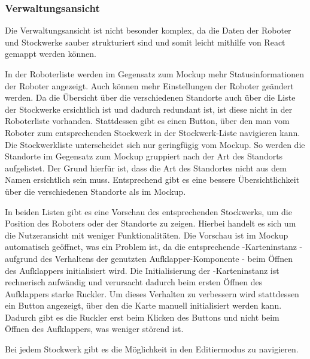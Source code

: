 \subsubsection{Verwaltungsansicht}
Die Verwaltungsansicht ist nicht besonder komplex, da die Daten der Roboter und Stockwerke sauber strukturiert sind und somit leicht mithilfe von React gemappt werden können.

In der Roboterliste werden im Gegensatz zum Mockup mehr Statusinformationen der Roboter angezeigt. Auch können mehr Einstellungen der Roboter geändert werden. Da die Übersicht über die verschiedenen Standorte auch über die Liste der Stockwerke ersichtlich ist und dadurch redundant ist, ist diese nicht in der Roboterliste vorhanden. Stattdessen gibt es einen Button, über den man vom Roboter zum entsprechenden Stockwerk in der Stockwerk-Liste navigieren kann. Die Stockwerkliste unterscheidet sich nur geringfügig vom Mockup. So werden die Standorte im Gegensatz zum Mockup gruppiert nach der Art des Standorts aufgelistet. Der Grund hierfür ist, dass die Art des Standortes nicht aus dem Namen ersichtlich sein muss. Entsprechend gibt es eine bessere Übersichtlichkeit über die verschiedenen Standorte als im Mockup.

In beiden Listen gibt es eine Vorschau des entsprechenden Stockwerks, um die Position des Roboters oder der Standorte zu zeigen. Hierbei handelt es sich um die Nutzeransicht mit weniger Funktionalitäten. Die Vorschau ist im Mockup automatisch geöffnet, was ein Problem ist, da die entsprechende \deckgl{}-Karteninstanz - aufgrund des Verhaltens der genutzten Aufklapper-Komponente - beim Öffnen des Aufklappers initialisiert wird. Die Initialisierung der \deckgl{}-Karteninstanz ist rechnerisch aufwändig und verursacht dadurch beim ersten Öffnen des Aufklappers starke Ruckler. Um dieses Verhalten zu verbessern wird stattdessen ein Button angezeigt, über den die Karte manuell initialisiert werden kann. Dadurch gibt es die Ruckler erst beim Klicken des Buttons und nicht beim Öffnen des Aufklappers, was weniger störend ist.

Bei jedem Stockwerk gibt es die Möglichkeit in den Editiermodus zu navigieren.

